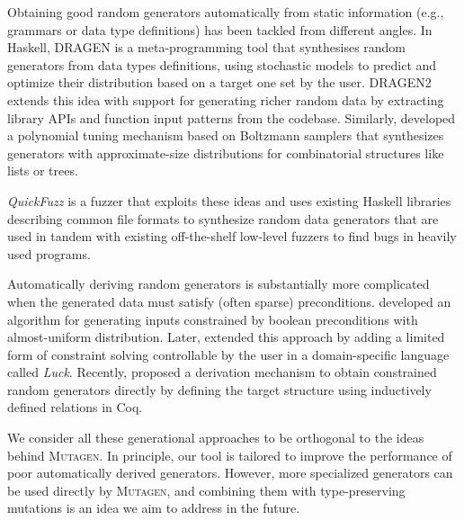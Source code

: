\documentclass[sigconf, anonymous, review]{acmart}
\newcommand{\mutagen}{\textsc{Mutagen}\xspace}
\begin{document}
Obtaining good random generators automatically from static information (e.g.,
grammars or data type definitions) has been tackled from different angles.
%
In Haskell, DRAGEN \cite{DBLP:conf/haskell/MistaRH18} is a meta-programming tool
that synthesises random generators from data types definitions, using stochastic
models to predict and optimize their distribution based on a target one set by
the user.
%
DRAGEN2 \cite{Mista2019GeneratingRS} extends this idea with support for
generating richer random data by extracting library APIs and function input
patterns from the codebase.
%
Similarly, \cite{Bendkowski2017} developed a polynomial tuning mechanism based
on Boltzmann samplers \cite{Duchon2004} that synthesizes generators with
approximate-size distributions for combinatorial structures like lists or trees.

%
%
\emph{QuickFuzz} \cite{GriecoCB16, grieco2017} is a fuzzer that exploits these
ideas and uses existing Haskell libraries describing common file formats to
synthesize random data generators that are used in tandem with existing
off-the-shelf low-level fuzzers to find bugs in heavily used programs.



Automatically deriving random generators is substantially more complicated when
the generated data must satisfy (often sparse) preconditions.
%
%
\citeauthor{ClaessenDP14} \citeyearpar{ClaessenDP14} developed an algorithm for
generating inputs constrained by boolean preconditions with almost-uniform
distribution.
%
%
Later, \citeauthor{LampropoulosGHH17} \citeyearpar{LampropoulosGHH17} extended
this approach by adding a limited form of constraint solving controllable by the
user in a domain-specific language called \emph{Luck}.
%
%
Recently, \citeauthor{Lampropoulos2017} \citeyearpar{Lampropoulos2017} proposed
a derivation mechanism to obtain constrained random generators directly by
defining the target structure using inductively defined relations in Coq.



We consider all these generational approaches to be orthogonal to the ideas
behind \mutagen.
%
In principle, our tool is tailored to improve the performance of poor
automatically derived generators.
%
However, more specialized generators can be used directly by \mutagen, and
combining them with type-preserving mutations is an idea we aim to address in
the future.
\end{document}

